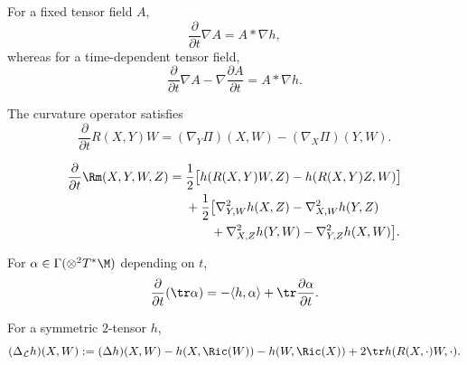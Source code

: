 \begin{remark}
\label{topping:variation-covariant-derivative-star}
For a fixed tensor field $A$,
\[
\frac{\partial}{\partial t}\nabla A=A*\nabla h,
\]
whereas for a time-dependent tensor field,
\[
\frac{\partial}{\partial t}\nabla A-\nabla\frac{\partial A}{\partial t}=A*\nabla h.
\]
\end{remark}

\begin{proposition}
\label{topping:variation-curvature-operator}
The curvature operator satisfies
\[
\frac{\partial}{\partial t}R(X,Y)W=(\nabla_Y\Pi)(X,W)-(\nabla_X\Pi)(Y,W).
\]
\end{proposition}

\begin{proposition}
\label{topping:variation-riemann-tensor}
\[
\begin{aligned}
\frac{\partial}{\partial t}\Rm(X,Y,W,Z)
={}&\frac12\bigl[h(R(X,Y)W,Z)-h(R(X,Y)Z,W)\bigr]\\
&+\frac12\bigl[\nabla^2_{Y,W}h(X,Z)-\nabla^2_{X,W}h(Y,Z)\\
&\qquad+\nabla^2_{X,Z}h(Y,W)-\nabla^2_{Y,Z}h(X,W)\bigr].
\end{aligned}
\]
\end{proposition}

\begin{proposition}
\label{topping:variation-trace}
For $\alpha\in\Gamma(\otimes^2T^*\M)$ depending on $t$,
\[
\frac{\partial}{\partial t}(\tr\alpha)
=-\langle h,\alpha\rangle+\tr\frac{\partial\alpha}{\partial t}.
\]
\end{proposition}

\begin{definition}
\label{topping:variation-lichnerowicz}
\leanok
For a symmetric $2$-tensor $h$,
\[
(\Delta_{\mathcal L}h)(X,W):=(\Delta h)(X,W)-h(X,\Ric(W))-h(W,\Ric(X))
+2\tr h(R(X,\cdot)W,\cdot).
\]
\end{definition}


